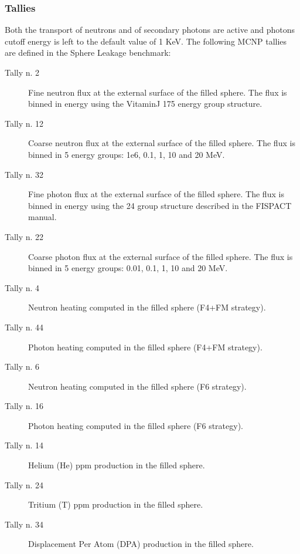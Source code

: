 \documentclass[letterpaper,10pt,english]{sphinxmanual}
\begin{document}
\subsubsection{Tallies}
\label{\detokenize{usage/benchmarks:tallies}}
\sphinxAtStartPar
Both the transport of neutrons and of secondary photons are active and photons cut\sphinxhyphen{}off energy  is
left to the default value of 1 KeV.
The following MCNP tallies are defined in the Sphere Leakage benchmark:
\begin{description}
\item[{Tally n. 2}] \leavevmode
\sphinxAtStartPar
Fine neutron flux at the external surface of the filled sphere. The flux is binned in energy using the Vitamin\sphinxhyphen{}J 175 energy group structure.

\item[{Tally n. 12}] \leavevmode
\sphinxAtStartPar
Coarse neutron flux at the external surface of the filled sphere. The flux is binned in 5 energy groups: 1e\sphinxhyphen{}6, 0.1, 1, 10 and 20 MeV.

\item[{Tally n. 32}] \leavevmode
\sphinxAtStartPar
Fine photon flux at the external surface of the filled sphere. The flux is binned in energy using the 24 group structure described in the FISPACT manual.

\item[{Tally n. 22}] \leavevmode
\sphinxAtStartPar
Coarse photon flux at the external surface of the filled sphere. The flux is binned in 5 energy groups: 0.01, 0.1, 1, 10 and 20 MeV.

\item[{Tally n. 4}] \leavevmode
\sphinxAtStartPar
Neutron heating computed in the filled sphere (F4+FM strategy).

\item[{Tally n. 44}] \leavevmode
\sphinxAtStartPar
Photon heating computed in the filled sphere (F4+FM strategy).

\item[{Tally n. 6}] \leavevmode
\sphinxAtStartPar
Neutron heating computed in the filled sphere (F6 strategy).

\item[{Tally n. 16}] \leavevmode
\sphinxAtStartPar
Photon heating computed in the filled sphere (F6 strategy).

\item[{Tally n. 14}] \leavevmode
\sphinxAtStartPar
Helium (He) ppm production in the filled sphere.

\item[{Tally n. 24}] \leavevmode
\sphinxAtStartPar
Tritium (T) ppm production in the filled sphere.

\item[{Tally n. 34}] \leavevmode
\sphinxAtStartPar
Displacement Per Atom (DPA) production in the filled sphere.

\end{description}
\end{document}

